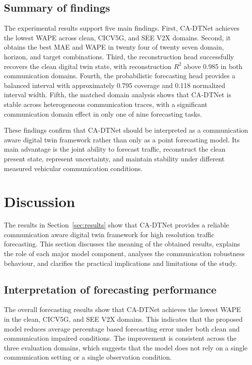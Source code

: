 \documentclass[pdflatex,sn-mathphys-num]{sn-jnl}%
\theoremstyle{thmstyleone}%
\theoremstyle{thmstyletwo}%
\theoremstyle{thmstylethree}%
\begin{document}
\subsection{Summary of findings}
\label{subsec:results_summary}

The experimental results support five main findings. First, CA-DTNet achieves the lowest WAPE across clean, CICV5G, and SEE V2X domains. Second, it obtains the best MAE and WAPE in twenty four of twenty seven domain, horizon, and target combinations. Third, the reconstruction head successfully recovers the clean digital twin state, with reconstruction \(R^{2}\) above 0.985 in both communication domains. Fourth, the probabilistic forecasting head provides a balanced interval with approximately 0.795 coverage and 0.118 normalized interval width. Fifth, the matched domain analysis shows that CA-DTNet is stable across heterogeneous communication traces, with a significant communication domain effect in only one of nine forecasting tasks.

These findings confirm that CA-DTNet should be interpreted as a communication aware digital twin framework rather than only as a point forecasting model. Its main advantage is the joint ability to forecast traffic, reconstruct the clean present state, represent uncertainty, and maintain stability under different measured vehicular communication conditions.

\section{Discussion}
\label{sec:discussion}

The results in Section~\ref{sec:results} show that CA-DTNet provides a reliable communication aware digital twin framework for high resolution traffic forecasting. This section discusses the meaning of the obtained results, explains the role of each major model component, analyses the communication robustness behaviour, and clarifies the practical implications and limitations of the study.

\subsection{Interpretation of forecasting performance}
\label{subsec:discussion_forecasting}

The overall forecasting results show that CA-DTNet achieves the lowest WAPE in the clean, CICV5G, and SEE V2X domains. This indicates that the proposed model reduces average percentage based forecasting error under both clean and communication impaired conditions. The improvement is consistent across the three evaluation domains, which suggests that the model does not rely on a single communication setting or a single observation condition.
\end{document}
